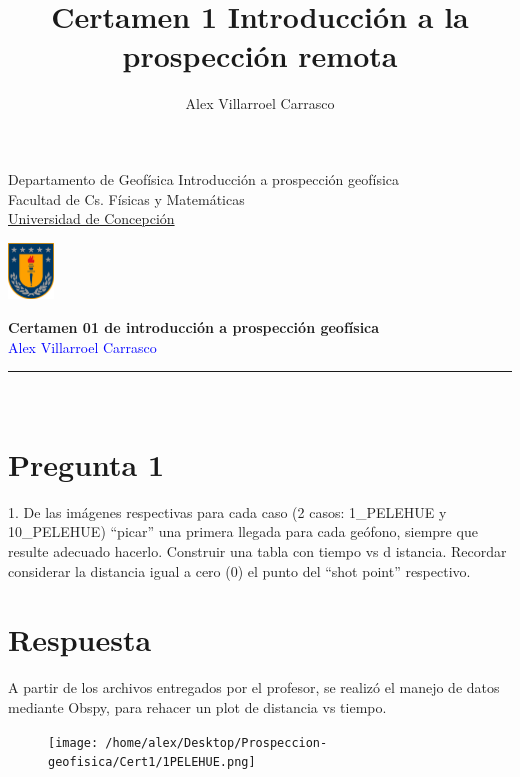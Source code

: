 \documentclass{article}
\title{Certamen 1 Introducción a la prospección remota}
\author{Alex Villarroel Carrasco}
\theoremstyle{mytheoremstyle}
\theoremstyle{mytheoremstyle}
\theoremstyle{myproblemstyle}
\begin{document}
\usetikzlibrary{positioning}
	\pagestyle{plain}
	\begin{flushleft}
		Departamento de Geofísica \hfill Introducción a prospección geofísica\\
		Facultad de Cs. Físicas y Matemáticas\\
		\underline{Universidad de Concepción}
	\end{flushleft}
	
	\begin{flushright}\vspace{-5mm}
		\includegraphics[height=1.5cm]{escudo.png}
	\end{flushright}
	
	\begin{center}\vspace{-1cm}
		\textbf{\large Certamen 01 de introducción a prospección geofísica}\\
		{\textcolor{blue}{Alex Villarroel Carrasco}}\\
	\end{center}
	\rule{\linewidth}{0.1mm}
	\\
    \section*{Pregunta 1}
	 1. De las imágenes respectivas para cada caso (2 casos: 1\_PELEHUE y 10\_PELEHUE)
		“picar” una primera llegada para cada geófono, siempre que resulte adecuado
		hacerlo. Construir una tabla con tiempo vs d istancia. Recordar considerar la
		distancia igual a cero (0) el punto del “shot point” respectivo.
	\section*{Respuesta}
	
	A partir de los archivos entregados por el profesor, se realizó el manejo de datos mediante Obspy, para rehacer un plot de distancia vs tiempo.
	\begin{figure}[h]
		\texttt{[image: /home/alex/Desktop/Prospeccion-geofisica/Cert1/1PELEHUE.png]}
	\end{figure}
\end{document}
